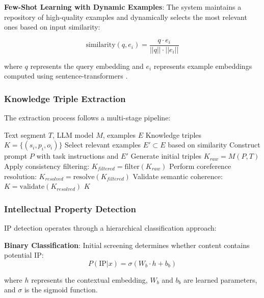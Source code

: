 \documentclass[11pt,a4paper]{article}
\begin{document}
\textbf{Few-Shot Learning with Dynamic Examples}: The system maintains a repository of high-quality examples and dynamically selects the most relevant ones based on input similarity:

\begin{equation}
\text{similarity}(q, e_i) = \frac{q \cdot e_i}{||q|| \cdot ||e_i||}
\end{equation}

where $q$ represents the query embedding and $e_i$ represents example embeddings computed using sentence-transformers \citep{reimers2019sentence}.

\subsubsection{Knowledge Triple Extraction}

The extraction process follows a multi-stage pipeline:

\begin{algorithm}[H]
\caption{Knowledge Triple Extraction}
\begin{algorithmic}[1]
\REQUIRE Text segment $T$, LLM model $M$, examples $E$
\ENSURE Knowledge triples $K = \{(s_i, p_i, o_i)\}$
\STATE Select relevant examples $E' \subset E$ based on similarity
\STATE Construct prompt $P$ with task instructions and $E'$
\STATE Generate initial triples $K_{raw} = M(P, T)$
\STATE Apply consistency filtering: $K_{filtered} = \text{filter}(K_{raw})$
\STATE Perform coreference resolution: $K_{resolved} = \text{resolve}(K_{filtered})$
\STATE Validate semantic coherence: $K = \text{validate}(K_{resolved})$
\RETURN $K$
\end{algorithmic}
\end{algorithm}

\subsubsection{Intellectual Property Detection}

IP detection operates through a hierarchical classification approach:

\textbf{Binary Classification}: Initial screening determines whether content contains potential IP:
\begin{equation}
P(\text{IP}|x) = \sigma(W_b \cdot h + b_b)
\end{equation}

where $h$ represents the contextual embedding, $W_b$ and $b_b$ are learned parameters, and $\sigma$ is the sigmoid function.
\end{document}
